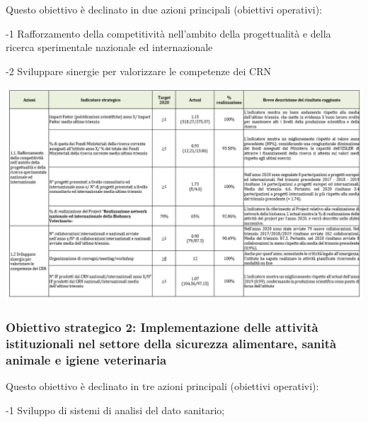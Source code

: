 \documentclass[
  12pt,
]{article}
\begin{document}
Questo obiettivo è declinato in due azioni principali (obiettivi
operativi):

-1 Rafforzamento della competitività nell'ambito della progettualità e
della ricerca sperimentale nazionale ed internazionale

-2 Sviluppare sinergie per valorizzare le competenze dei CRN

\begin{center}\includegraphics[width=1.1\linewidth]{figure/ob1} \end{center}

\newpage

\hypertarget{obiettivo-strategico-2-implementazione-delle-attivituxe0-istituzionali-nel-settore-della-sicurezza-alimentare-sanituxe0-animale-e-igiene-veterinaria}{%
\subsubsection*{\texorpdfstring{Obiettivo strategico 2:
\textbf{Implementazione delle attività istituzionali nel settore della
sicurezza alimentare, sanità animale e igiene
veterinaria}}{Obiettivo strategico 2: Implementazione delle attività istituzionali nel settore della sicurezza alimentare, sanità animale e igiene veterinaria}}\label{obiettivo-strategico-2-implementazione-delle-attivituxe0-istituzionali-nel-settore-della-sicurezza-alimentare-sanituxe0-animale-e-igiene-veterinaria}}

Questo obiettivo è declinato in tre azioni principali (obiettivi
operativi):

-1 Sviluppo di sistemi di analisi del dato sanitario;
\end{document}
